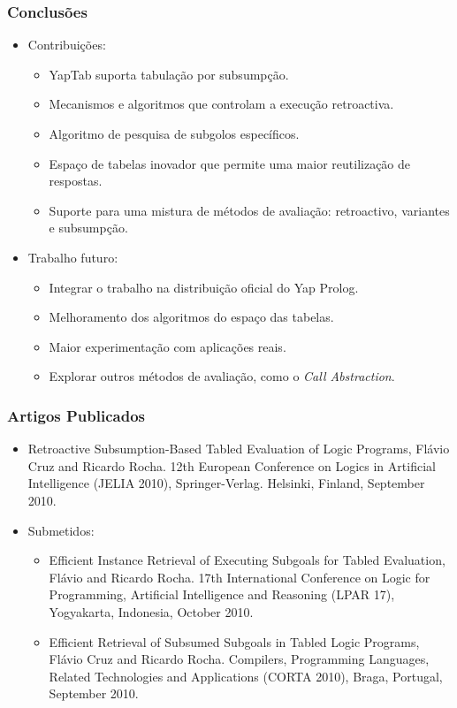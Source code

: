 \documentclass{beamer}
\begin{document}
\begin{frame}
   \frametitle{Conclusões}
   \begin{itemize}
      \item Contribuições:
      \begin{itemize}
         \item YapTab suporta tabulação por subsumpção.
         \item Mecanismos e algoritmos que controlam a execução retroactiva.
         \item Algoritmo de pesquisa de subgolos específicos.
         \item Espaço de tabelas inovador que permite uma maior reutilização de respostas.
         \item Suporte para uma mistura de métodos de avaliação: retroactivo, variantes e subsumpção.
         \pause
      \end{itemize}
      \item Trabalho futuro:
      \begin{itemize}
         \item Integrar o trabalho na distribuição oficial do Yap Prolog.
         \item Melhoramento dos algoritmos do espaço das tabelas.
         \item Maior experimentação com aplicações reais.
         \item Explorar outros métodos de avaliação, como o \emph{Call Abstraction}.
      \end{itemize}
   \end{itemize}
\end{frame}

\begin{frame}
   \frametitle{Artigos Publicados}
   \begin{itemize}
      \item Retroactive Subsumption-Based Tabled Evaluation of Logic Programs, Flávio Cruz and Ricardo Rocha. 12th European Conference on Logics in Artificial Intelligence (JELIA 2010), Springer-Verlag. Helsinki, Finland, September 2010.
      \item Submetidos:
         \begin{itemize}
      \item Efficient Instance Retrieval of Executing Subgoals for Tabled Evaluation, Flávio and Ricardo Rocha. 17th International Conference on Logic for Programming, Artificial Intelligence and Reasoning (LPAR 17), Yogyakarta, Indonesia, October 2010.
      \item Efficient Retrieval of Subsumed Subgoals in Tabled Logic Programs, Flávio Cruz and Ricardo Rocha. Compilers, Programming Languages, Related Technologies and Applications (CORTA 2010), Braga, Portugal, September 2010.
   \end{itemize}
   \end{itemize}
\end{frame}
   
\end{document}

